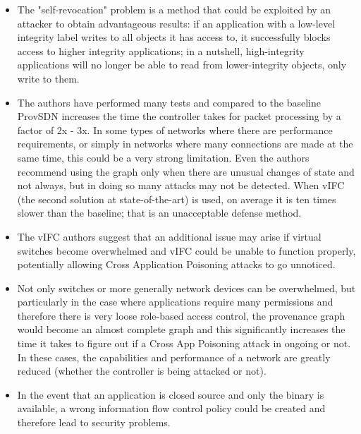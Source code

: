 \documentclass[a4paper,10pt]{memoir}
\begin{document}
{\begin{itemize}
\item The "self-revocation" problem is a method that could be exploited by an attacker to obtain advantageous results: if an application with a low-level integrity label writes to all objects it has access to, it successfully blocks access to higher integrity applications; in a nutshell, high-integrity applications will no longer be able to read from lower-integrity objects, only write to them.
\item The authors have performed many tests and compared to the baseline ProvSDN increases the time the controller takes for packet processing by a factor of 2x - 3x. In some types of networks where there are performance requirements, or simply in networks where many connections are made at the same time, this could be a very strong limitation. Even the authors recommend using the graph only when there are unusual changes of state and not always, but in doing so many attacks may not be detected. When vIFC (the second solution at state-of-the-art) is used, on average it is ten times slower than the baseline; that is an unacceptable defense method.
\item The vIFC authors suggest that an additional issue may arise if virtual switches become overwhelmed and vIFC could be unable to function properly, potentially allowing Cross Application Poisoning attacks to go unnoticed.
\item Not only switches or more generally network devices can be overwhelmed, but particularly in the case where applications require many permissions and therefore there is very loose role-based access control, the provenance graph would become an almost complete graph and this significantly increases the time it takes to figure out if a Cross App Poisoning attack in ongoing or not. In these cases, the capabilities and performance of a network are greatly reduced (whether the controller is being attacked or not).
\item In the event that an application is closed source and only the binary is available, a wrong information flow control policy could be created and therefore lead to security problems.
\end{itemize}
\medskip

}
\end{document}
